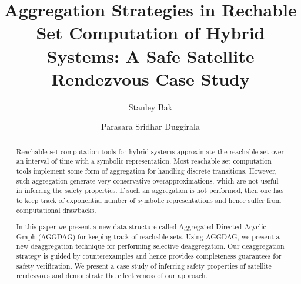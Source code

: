 \documentclass[runningheads]{llncs}
\begin{document}
%
\title{Aggregation Strategies in Rechable Set Computation of Hybrid Systems: A Safe Satellite Rendezvous Case Study}
%
%
\author{Stanley Bak \and
Parasara Sridhar Duggirala}
%
% 
%
%
\maketitle              %
%
\begin{abstract}
Reachable set computation tools for hybrid systems approximate the reachable set over an interval of time with a symbolic representation. 
Most reachable set computation tools implement some form of aggregation for handling discrete transitions. However, such aggregation generate very conservative overapproximations, which are not useful in inferring the safety properties. If such an aggregation is not performed, then one has to keep track of exponential number of symbolic representations and hence suffer from computational drawbacks.

In this paper we present a new data structure called Aggregated Directed Acyclic Graph (AGGDAG) for keeping track of reachable sets. Using AGGDAG, we present a new deaggregation technique for performing selective deaggregation. Our deaggregation strategy is guided by counterexamples and hence provides completeness guarantees for safety verification. We present a case study of inferring safety properties of satellite rendezvous and demonstrate the effectiveness of our approach.




\end{abstract}
%
%
%





\end{document}
